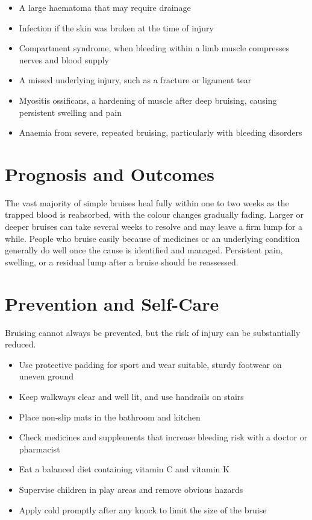 \begin{itemize}
    \item A large haematoma that may require drainage
    \item Infection if the skin was broken at the time of injury
    \item Compartment syndrome, when bleeding within a limb muscle compresses nerves and blood supply
    \item A missed underlying injury, such as a fracture or ligament tear
    \item Myositis ossificans, a hardening of muscle after deep bruising, causing persistent swelling and pain
    \item Anaemia from severe, repeated bruising, particularly with bleeding disorders
\end{itemize}

\section*{Prognosis and Outcomes}
The vast majority of simple bruises heal fully within one to two weeks as the trapped blood is reabsorbed, with the colour changes gradually fading. Larger or deeper bruises can take several weeks to resolve and may leave a firm lump for a while. People who bruise easily because of medicines or an underlying condition generally do well once the cause is identified and managed. Persistent pain, swelling, or a residual lump after a bruise should be reassessed.

\section*{Prevention and Self-Care}
Bruising cannot always be prevented, but the risk of injury can be substantially reduced.

\begin{itemize}
    \item Use protective padding for sport and wear suitable, sturdy footwear on uneven ground
    \item Keep walkways clear and well lit, and use handrails on stairs
    \item Place non-slip mats in the bathroom and kitchen
    \item Check medicines and supplements that increase bleeding risk with a doctor or pharmacist
    \item Eat a balanced diet containing vitamin C and vitamin K
    \item Supervise children in play areas and remove obvious hazards
    \item Apply cold promptly after any knock to limit the size of the bruise
\end{itemize}

